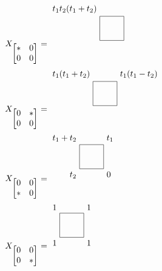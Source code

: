 \documentclass[12pt]{article}
\begin{document}
\begin{align*}
	X_{\begin{bmatrix}
		   * & 0 \\
		   0 & 0 \\
	   \end{bmatrix}} & = \begin{tikzpicture}[scale = 1/2]
		                      \draw (0,0) rectangle (2,2);
		                      \node at (0,0) [below left] {};
		                      \node at (2,0) [below right] {};
		                      \node at (2,2) [above right] {};
		                      \node at (0,2) [above left] {$t_1t_2(t_1 + t_2)$};
	                      \end{tikzpicture} \\
	X_{\begin{bmatrix}
				   0 & * \\
				   0 & 0 \\
			   \end{bmatrix}} & = \begin{tikzpicture}[scale = 1/2]
		                      \draw (0,0) rectangle (2,2);
		                      \node at (0,0) [below left] {};
		                      \node at (2,0) [below right] {};
		                      \node at (2,2) [above right] {$t_1(t_1 - t_2)$};
		                      \node at (0,2) [above left] {$t_1(t_1 + t_2)$};
	                      \end{tikzpicture}   \\
	X_{\begin{bmatrix}
				   0 & 0 \\
				   * & 0
			   \end{bmatrix}} & = \begin{tikzpicture}[scale = 1/2]
		                      \draw (0,0) rectangle (2,2);
		                      \node at (0,0) [below left] {$t_2$};
		                      \node at (2,0) [below right] {$0$};
		                      \node at (2,2) [above right] {$t_1$};
		                      \node at (0,2) [above left] {$t_1 + t_2$};
	                      \end{tikzpicture}   \\
	X_{\begin{bmatrix}
				   0 & 0 \\
				   0 & * \\
			   \end{bmatrix}
	}                  & = \begin{tikzpicture}[scale = 1/2]
		                       \draw (0,0) rectangle (2,2);
		                       \node at (0,0) [below left] {$1$};
		                       \node at (2,0) [below right] {$1$};
		                       \node at (2,2) [above right] {$1$};
		                       \node at (0,2) [above left] {$1$};
	                       \end{tikzpicture}                 \\
\end{align*}
\end{document}
